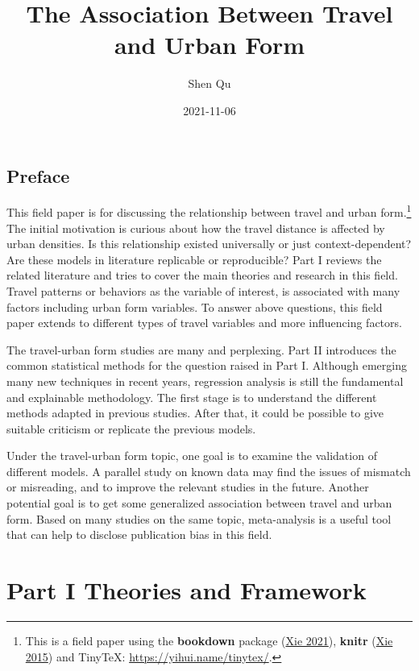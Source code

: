 \documentclass[
  11pt,
  openany]{memoir}
\title{The Association Between Travel and Urban Form}
\author{Shen Qu}
\date{2021-11-06}
\begin{document}
\maketitle

{
\setcounter{tocdepth}{1}
\tableofcontents
}
\hypertarget{preface}{%
\chapter*{Preface}\label{preface}}

This field paper is for discussing the relationship between travel and urban form.\footnote{This is a field paper using the \textbf{bookdown} package (\protect\hyperlink{ref-R-bookdown}{Xie 2021}), \textbf{knitr} (\protect\hyperlink{ref-xie2015}{Xie 2015}) and TinyTeX: \url{https://yihui.name/tinytex/}.}
The initial motivation is curious about how the travel distance is affected by urban densities.
Is this relationship existed universally or just context-dependent?
Are these models in literature replicable or reproducible?
Part I reviews the related literature and tries to cover the main theories and research in this field.
Travel patterns or behaviors as the variable of interest, is associated with many factors including urban form variables.
To answer above questions, this field paper extends to different types of travel variables and more influencing factors.

The travel-urban form studies are many and perplexing.
Part II introduces the common statistical methods for the question raised in Part I.
Although emerging many new techniques in recent years, regression analysis is still the fundamental and explainable methodology.
The first stage is to understand the different methods adapted in previous studies.
After that, it could be possible to give suitable criticism or replicate the previous models.

Under the travel-urban form topic, one goal is to examine the validation of different models. A parallel study on known data may find the issues of mismatch or misreading, and to improve the relevant studies in the future.
Another potential goal is to get some generalized association between travel and urban form. Based on many studies on the same topic, meta-analysis is a useful tool that can help to disclose publication bias in this field.

\hypertarget{part-part-i-theories-and-framework}{%
\part*{Part I Theories and Framework}\label{part-part-i-theories-and-framework}}
\end{document}
